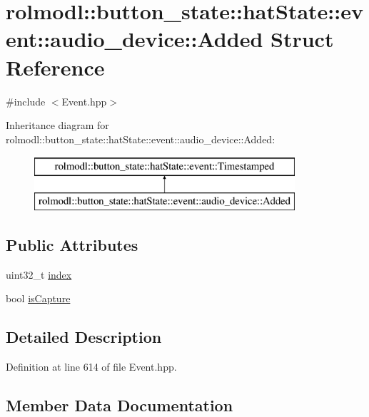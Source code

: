 \hypertarget{structrolmodl_1_1button__state_1_1hat_state_1_1event_1_1audio__device_1_1_added}{}\section{rolmodl\+::button\+\_\+state\+::hat\+State\+::event\+::audio\+\_\+device\+::Added Struct Reference}
\label{structrolmodl_1_1button__state_1_1hat_state_1_1event_1_1audio__device_1_1_added}


{\ttfamily \#include $<$Event.\+hpp$>$}

Inheritance diagram for rolmodl\+::button\+\_\+state\+::hat\+State\+::event\+::audio\+\_\+device\+::Added\+:\begin{figure}[H]
\begin{center}
\leavevmode
\includegraphics[height=2.000000cm]{structrolmodl_1_1button__state_1_1hat_state_1_1event_1_1audio__device_1_1_added}
\end{center}
\end{figure}
\subsection*{Public Attributes}
\begin{DoxyCompactItemize}
\item 
uint32\+\_\+t \mbox{\hyperlink{structrolmodl_1_1button__state_1_1hat_state_1_1event_1_1audio__device_1_1_added_aa24d0288028d857c071fcfa7ec11feb0}{index}}
\item 
bool \mbox{\hyperlink{structrolmodl_1_1button__state_1_1hat_state_1_1event_1_1audio__device_1_1_added_a37b24a9147380c55eeac7a8a6e8b728c}{is\+Capture}}
\end{DoxyCompactItemize}


\subsection{Detailed Description}


Definition at line 614 of file Event.\+hpp.



\subsection{Member Data Documentation}
\mbox{\label{structrolmodl_1_1button__state_1_1hat_state_1_1event_1_1audio__device_1_1_added_aa24d0288028d857c071fcfa7ec11feb0}} 
